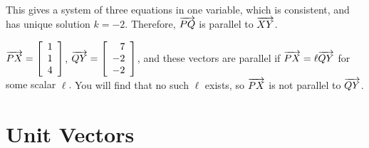 \documentclass[pdf]{beamer}
\begin{document}
{{\begin{solution}
\pause
This gives a system of three equations in one variable,
\pause
which is consistent, and has unique solution $k=-2$.
\pause
\alert{Therefore, $\overrightarrow{PQ}$ 
is parallel to $\overrightarrow{XY}$.}
\pause
\medskip

$\overrightarrow{PX} =
\left[\begin{array}{r} 1 \\ 1 \\ 4 \end{array}\right]$,
\pause
$\overrightarrow{QY} =
\left[\begin{array}{r} 7 \\ -2 \\ -2 \end{array}\right]$,
\pause
and these vectors are parallel if
$\overrightarrow{PX} = \ell\overrightarrow{QY}$ for some 
scalar $\ell$.
\pause
\alert{You will find that no such $\ell$ exists, so
$\overrightarrow{PX}$ 
is not parallel to $\overrightarrow{QY}$.}

\end{solution}
}

\section{Unit Vectors}

}
\end{document}
